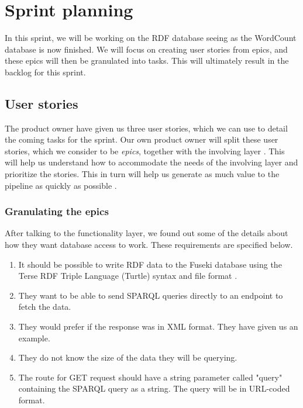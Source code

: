 \section{Sprint planning}
In this sprint, we will be working on the RDF database seeing as the WordCount database is now finished.
We will focus on creating user stories from epics, and these epics will then be granulated into tasks.
This will ultimately result in the backlog for this sprint.

\subsection*{User stories}
The \knox{} product owner have given us three user stories, which we can use to detail the coming tasks for the sprint.
Our own product owner will split these user stories, which we consider to be \textit{epics}, together with the involving layer \cite{Epics}.
This will help us understand how to accommodate the needs of the involving layer and prioritize the stories.
This in turn will help us generate as much value to the pipeline as quickly as possible \cite{UserStories}.


\subsubsection*{Granulating the epics}
After talking to the functionality layer, we found out some of the details about how they want database access to work. These requirements are specified below.

\begin{enumerate}
    \item It should be possible to write RDF data to the Fuseki database using the Terse RDF Triple Language (Turtle) syntax and file format \cite{TurtleFormat}.
    \item They want to be able to send SPARQL queries directly to an endpoint to fetch the data.
    \item They would prefer if the response was in XML format. They have given us an example.
    \item They do not know the size of the data they will be querying.
    \item The route for GET request should have a string parameter called "query" containing the SPARQL query as a string.
    The query will be in URL-coded format.
\end{enumerate}

